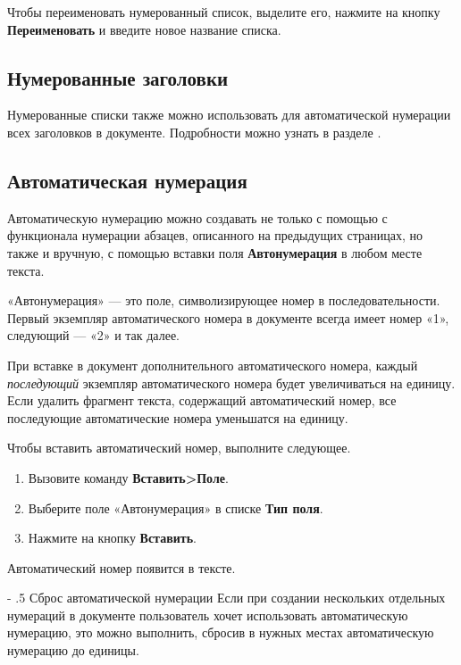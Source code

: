 ﻿\documentclass[a4paper,10pt]{article}
\makeatletter
\renewcommand\paragraph{%
   \@startsection{paragraph}{4}{0mm}%
      {-\baselineskip}%
      {.5\baselineskip}%
      {\normalfont\normalsize\bfseries}}
\makeatother
\begin{document}
Чтобы переименовать нумерованный список, выделите его, нажмите на кнопку \textbf{Переименовать} и введите новое название списка.

\subsection{Нумерованные заголовки}
Нумерованные списки также можно использовать для автоматической нумерации всех заголовков в документе. Подробности можно узнать в разделе .

\subsection{Автоматическая нумерация}
Автоматическую нумерацию можно создавать не только с помощью с функционала нумерации абзацев, описанного на предыдущих страницах, но также и вручную, с помощью вставки поля \textbf{Автонумерация} в любом месте текста.

«Автонумерация» — это поле, символизирующее номер в последовательности. Первый экземпляр автоматического номера в документе всегда имеет номер «1», следующий — «2» и так далее.

При вставке в документ дополнительного автоматического номера, каждый \textit{последующий} экземпляр автоматического номера будет увеличиваться на единицу. Если удалить фрагмент текста, содержащий автоматический номер, все последующие автоматические номера уменьшатся на единицу. 

Чтобы вставить автоматический номер, выполните следующее.
\begin{enumerate}
 \item Вызовите команду \textbf{Вставить>Поле}.
 \item Выберите поле «Автонумерация» в списке \textbf{Тип поля}.
 \item Нажмите на кнопку \textbf{Вставить}.
\end{enumerate}

Автоматический номер появится в тексте.

\paragraph{Сброс автоматической нумерации}
Если при создании нескольких отдельных нумераций в документе пользователь хочет использовать автоматическую нумерацию, это можно выполнить, сбросив в нужных местах автоматическую нумерацию до единицы.
\end{document}
